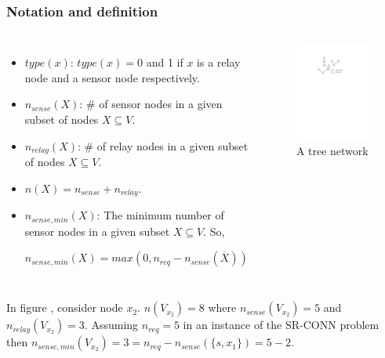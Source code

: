 \documentclass{beamer}
\newcommand{\SRCONN}   { {\mathrm {SR\mbox{-}CONN}} }
\begin{document}
\begin{frame}
\frametitle{Notation and definition}
\begin{columns}[t]
\vspace{-1.7em}
\begin{itemize}
\item	$type(x)$: $type(x)= 0$ and 1 if $x$ is a relay node and 
 a sensor node respectively.

\item	$n_{sense}(X)$: \# of sensor nodes in a given subset  of nodes $X\subseteq V$.

\item   $n_{relay}(X)$: \# of relay nodes in a given subset of nodes $X\subseteq V$.

\item $n(X)=n_{sense} + n_{relay}$.

\item $n_{sense,min}(X)$: The minimum number of sensor nodes in a given subset $X\subseteq V$. So,\\
\centerline{
$n_{sense,min}(X)=max(0,n_{req}-n_{sense}(\overline{X}))$
}
\end{itemize}
\begin{figure}[!htb]
\centering
\includegraphics[width=1.7 in, height=0.8 in]{Ch4f1.pdf}
 \caption{ A tree network}
\label{fig:es31}
\end{figure}
\end{columns}

\begin{example}
\normalfont
In figure , consider node $x_2$. $n(V_{x_2})=8$ where $n_{sense}(V_{x_2})=5$ and $n_{relay}(V_{x_2})=3$. Assuming $n_{req}=5$ in an instance of the $\SRCONN$ problem then $n_{sense,min}(V_{x_2})=3=n_{req}-n_{sense}(\{s,x_1\})=5-2$. 
\end{example}
\end{frame}
\end{document}
